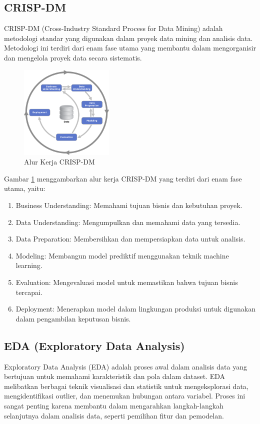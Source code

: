 \subsection{CRISP-DM}
CRISP-DM (Cross-Industry Standard Process for Data Mining) adalah metodologi standar yang digunakan dalam proyek data mining dan analisis data. Metodologi ini terdiri dari enam fase utama yang membantu dalam mengorganisir dan mengelola proyek data secara sistematis. \parencite{chumbar2020crispdm}

\begin{figure}[H]
    \centering
    \includegraphics[width=0.4\textwidth]{Gambar/CRISP-DM.png}
    \caption{Alur Kerja CRISP-DM}
    \label{fig:crisp-dm2}
\end{figure}

Gambar \ref{fig:crisp-dm2} menggambarkan alur kerja CRISP-DM yang terdiri dari enam fase utama, yaitu:
\begin{enumerate}
    \item Business Understanding: Memahami tujuan bisnis dan kebutuhan proyek.
    \item Data Understanding: Mengumpulkan dan memahami data yang tersedia.
    \item Data Preparation: Membersihkan dan mempersiapkan data untuk analisis.
    \item Modeling: Membangun model prediktif menggunakan teknik machine learning.
    \item Evaluation: Mengevaluasi model untuk memastikan bahwa tujuan bisnis tercapai.
    \item Deployment: Menerapkan model dalam lingkungan produksi untuk digunakan dalam pengambilan keputusan bisnis.
\end{enumerate}

\subsection{EDA (Exploratory Data Analysis)}
Exploratory Data Analysis (EDA) adalah proses awal dalam analisis data yang bertujuan untuk memahami karakteristik dan pola dalam dataset. EDA melibatkan berbagai teknik visualisasi dan statistik untuk mengeksplorasi data, mengidentifikasi outlier, dan menemukan hubungan antara variabel. Proses ini sangat penting karena membantu dalam mengarahkan langkah-langkah selanjutnya dalam analisis data, seperti pemilihan fitur dan pemodelan. \parencite{tukey1977exploratory}

